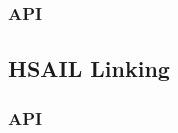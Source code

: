 \documentclass[final]{book}
\newcommand{\hsaarg}[1]{\textit{#1}}
\begin{document}







\subsubsection{API}


\hypertarget{linking}{}\subsection{HSAIL Linking}\label{linking}
\subsubsection{API}

\end{document}
